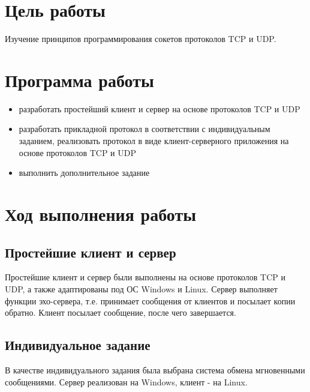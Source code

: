 







\section{Цель работы}

Изучение принципов программирования сокетов протоколов TCP и UDP.

\section{Программа работы}

\begin{itemize}
\item разработать простейший клиент и сервер на основе протоколов TCP и UDP
\item разработать прикладной протокол в соответствии с индивидуальным заданием, реализовать протокол в виде клиент-серверного приложения на основе протоколов TCP и UDP
\item выполнить дополнительное задание
\end{itemize}

\section{Ход выполнения работы}

\subsection{Простейшие клиент и сервер}
Простейшие клиент и сервер были выполнены на основе протоколов TCP и UDP, а также адаптированы под ОС Windows и Linux. Сервер выполняет функции эхо-сервера, т.е. принимает сообщения от клиентов и посылает копии обратно. Клиент посылает сообщение, после чего завершается.

\subsection{Индивидуальное задание}

В качестве индивидуального задания была выбрана система обмена мгновенными сообщениями. Сервер реализован на Windows, клиент - на Linux.

